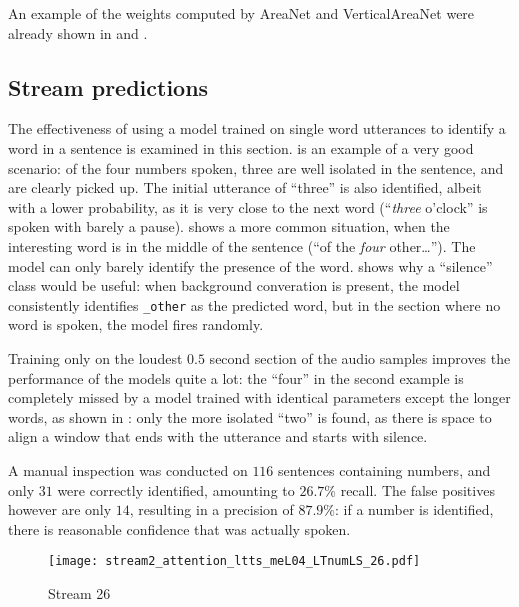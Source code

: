 An example of the weights computed by AreaNet and VerticalAreaNet were already shown 
in  and .

\subsection{Stream predictions}

The effectiveness of using a model trained on single word utterances to
identify a word in a sentence is examined in this section.
 is an example of a very good
scenario: of the four numbers spoken, three are well isolated in the sentence,
and are clearly picked up. The initial utterance of ``three'' is also
identified, albeit with a lower probability, as it is very close to the next
word (``\textit{three} o'clock'' is spoken with barely a pause).
 shows a more common situation,
when the interesting word is in the middle of the sentence (``of the
\textit{four} other\ldots''). The model can only barely identify the presence
of the word.
 shows why a ``silence'' class
would be useful: when background converation is present, the model consistently
identifies \texttt{\_other} as the predicted word, but in the section where no
word is spoken, the model fires randomly.

Training only on the loudest $0.5$ second section of the audio samples improves
the performance of the models quite a lot: the ``four'' in the second example
is completely missed by a model trained with identical parameters except the
longer words, as shown in : only
the more isolated ``two'' is found, as there is space to align a window that
ends with the utterance and starts with silence.

A manual inspection was conducted on $116$ sentences containing numbers, and
only $31$ were correctly identified, amounting to $26.7\%$ recall.
The false positives however are only $14$, resulting in a precision of
$87.9\%$: if a number is identified, there is reasonable confidence that was
actually spoken.

\begin{figure}[h!]
    \centering
    \texttt{[image: stream2\_attention\_ltts\_meL04\_LTnumLS\_26.pdf]}
    \caption{Stream 26}%
    \label{fig:stream_attention_ltts_meL04_LTnumLS_26}
\end{figure}

